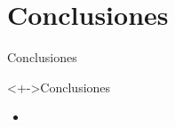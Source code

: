 \documentclass[xcolor=dvipsnames]{beamer}
\begin{document}
\section{Conclusiones}
\begin{frame}{Conclusiones} 
\begin{block}<+->{Conclusiones}   
    \begin{itemize}
      \scriptsize
     	\item     	
    \end{itemize}
  \end{block}
\end{frame}
\end{document}
